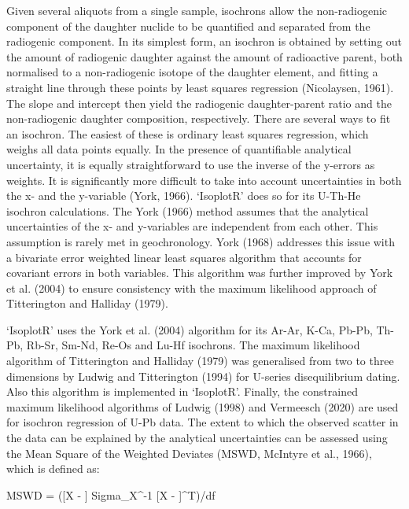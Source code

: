      Given several aliquots from a single sample, isochrons allow the
     non-radiogenic component of the daughter nuclide to be quantified
     and separated from the radiogenic component. In its simplest form,
     an isochron is obtained by setting out the amount of radiogenic
     daughter against the amount of radioactive parent, both normalised
     to a non-radiogenic isotope of the daughter element, and fitting a
     straight line through these points by least squares regression
     (Nicolaysen, 1961). The slope and intercept then yield the
     radiogenic daughter-parent ratio and the non-radiogenic daughter
     composition, respectively. There are several ways to fit an
     isochron.  The easiest of these is ordinary least squares
     regression, which weighs all data points equally. In the presence
     of quantifiable analytical uncertainty, it is equally
     straightforward to use the inverse of the y-errors as weights.  It
     is significantly more difficult to take into account uncertainties
     in both the x- and the y-variable (York, 1966). ‘IsoplotR’ does so
     for its U-Th-He isochron calculations. The York (1966) method
     assumes that the analytical uncertainties of the x- and
     y-variables are independent from each other. This assumption is
     rarely met in geochronology.  York (1968) addresses this issue
     with a bivariate error weighted linear least squares algorithm
     that accounts for covariant errors in both variables. This
     algorithm was further improved by York et al. (2004) to ensure
     consistency with the maximum likelihood approach of Titterington
     and Halliday (1979).

     ‘IsoplotR’ uses the York et al. (2004) algorithm for its Ar-Ar,
     K-Ca, Pb-Pb, Th-Pb, Rb-Sr, Sm-Nd, Re-Os and Lu-Hf isochrons. The
     maximum likelihood algorithm of Titterington and Halliday (1979)
     was generalised from two to three dimensions by Ludwig and
     Titterington (1994) for U-series disequilibrium dating. Also this
     algorithm is implemented in ‘IsoplotR’. Finally, the constrained
     maximum likelihood algorithms of Ludwig (1998) and Vermeesch
     (2020) are used for isochron regression of U-Pb data. The extent
     to which the observed scatter in the data can be explained by the
     analytical uncertainties can be assessed using the Mean Square of
     the Weighted Deviates (MSWD, McIntyre et al., 1966), which is
     defined as:

     MSWD = ([X - ] Sigma_{X}^{-1} [X - ]^T)/df

